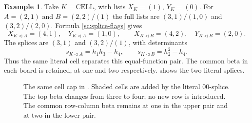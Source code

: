 \documentclass[11pt,a4paper]{amsart}
\numberwithin{equation}{section}
\theoremstyle{plain}
\theoremstyle{definition}
\newtheorem{example}[theorem]{Example}
\begin{document}
\begin{example}\label{ex:same-cell-cap}
Take \(K=\mathrm{CELL}\), with lists \(X_K=(1)\), \(Y_K=(0)\).
For \(A=(2,1)\) and \(B=(2,2)/(1)\) the full lists are
\((3,1)/(1,0)\) and \((3,2)/(2,0)\).  Formula
\eqref{sc:splice-flags} gives
\[
 X_{K\triangleleft A}=(4,1),\quad Y_{K\triangleleft A}=(1,0),
 \qquad
 X_{K\triangleleft B}=(4,2),\quad Y_{K\triangleleft B}=(2,0).
\]
The splices are \((3,1)\) and \((3,2)/(1)\), with determinants
\[
 s_{K\triangleleft A}=h_1h_3-h_4,
 \qquad s_{K\triangleleft B}=h_2^2-h_4.
\]
Thus the same literal cell separates this equal-function pair.
The common beta in each board is retained, at one and two respectively.
 shows the two literal splices.
\end{example}

\begin{figure}[t]
\centering
{}
\caption{The same cell cap in .  Shaded cells are
added by the literal \(00\)-splice.  The top beta changes from three to
four; no new row is introduced.  The common row-column beta remains at
one in the upper pair and at two in the lower pair.}
\label{fig:cell-splice}
\end{figure}
\end{document}
